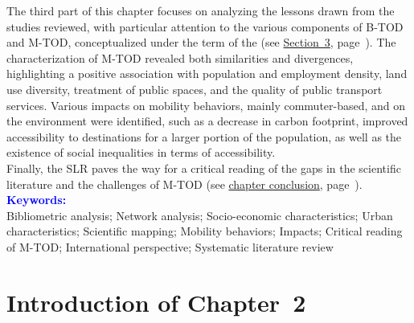 \begin{refsegment}
\begin{tcolorbox}
{The third part of this chapter focuses on analyzing the lessons drawn from the studies reviewed, with particular attention to the various components of B-TOD and M-TOD, conceptualized under the term of the  (see \hyperref[chap2:caracterisation-btod-environnement-urbain-choix-individuels]{Section~3}, page~\pageref{chap2:caracterisation-btod-environnement-urbain-choix-individuels}). The characterization of M-TOD revealed both similarities and divergences, highlighting a positive association with population and employment density, land use diversity, treatment of public spaces, and the quality of public transport services. Various impacts on mobility behaviors, mainly commuter-based, and on the environment were identified, such as a decrease in carbon footprint, improved accessibility to destinations for a larger portion of the population, as well as the existence of social inequalities in terms of accessibility.%
    \\
Finally, the SLR paves the way for a critical reading of the gaps in the scientific literature and the challenges of M-TOD (see \hyperref[chap2:conclusion]{chapter conclusion}, page~\pageref{chap2:conclusion}).%
    }
    \tcblower
\Large{\textbf{\textcolor{blue}{Keywords:}}}
    \\
    \small{
Bibliometric analysis;
Network analysis;
Socio-economic characteristics;
Urban characteristics;
Scientific mapping;
Mobility behaviors;
Impacts;
Critical reading of M-TOD;
International perspective;
Systematic literature review
    }
    \end{tcolorbox}

\newpage
{} %
\section*{Introduction of Chapter~2
    \label{chap2:introduction}
    }


\end{refsegment}
